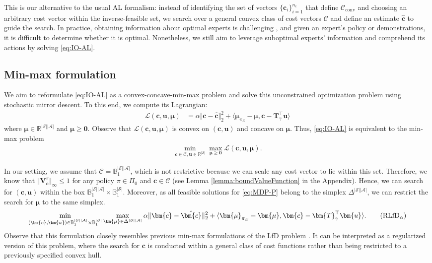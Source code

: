 \documentclass[10pt]{article} %
\def\C{\ensuremath{\mathcal{C}}}
\def\Ac{\ensuremath{\mathcal{A}}}
\def\mTg{{\bm{T}}_\gamma}
\def\vzero{{\bm{0}}}
\def\vc{{\bm{c}}}
\def\vu{{\bm{u}}}
\def\vV{{\bm{V}}}
\def\vmu{{\bm{\mu}}}
\def\sB{{\mathbb{B}}}
\newcommand{\R}{\mathbb{R}}
\newcommand{\St}{\mathcal{S}}
\begin{document}
This is our alternative to the usual AL formalism: instead of identifying the set of vectors $\{\vc_i\}_{i=1}^{n_c}$ that define $\C_{\text{conv}}$ and choosing an arbitrary cost vector within the inverse-feasible set, we search over a general convex class of cost vectors $\C$ and define an estimate $\hat{\vc}$ to guide the search. In practice, obtaining information about optimal experts is challenging \citep{Brown2019, Chen2021, Wang2021}, and given an expert's policy or demonstrations, it is difficult to determine whether it is optimal. Nonetheless, we still aim to leverage suboptimal experts' information and comprehend its actions by solving \ref{eq:IO-AL}.

\subsection{Min-max formulation}
We aim to reformulate \eqref{eq:IO-AL} as a convex-concave-min-max problem and solve this unconstrained optimization problem using stochastic mirror descent. To this end, we compute its Lagrangian:
\begin{align*}
    \mathcal{L}(\vc, \vu, \vmu)  &= \alpha\Vert \vc - \hat{\vc} \Vert^2_2 + \langle \vmu_{\pi_E} -\vmu, \vc - \mTg^\top \vu \rangle
\end{align*}
where $\vmu \in \R^{|\St||\Ac|}$ and $\vmu \geq \vzero$. Observe that $\mathcal{L}(\vc,\vu,\vmu)$ is convex on $(\vc,\vu)$ and concave on $\vmu$. Thus, \eqref{eq:IO-AL} is equivalent to the min-max problem
\begin{align*}
    \min\limits_{\vc\in\C, \vu\in\R^{|\St|}}\max_{\vmu \geq \vzero} \mathcal{L}(\vc, \vu, \vmu).
\end{align*}
\par 
In our setting, we assume that $\C= \sB^{|\St||\Ac|}_1$, which is not restrictive because we can scale any cost vector to lie within this set. Therefore, we know that $\Vert \vV^\pi_{\vc}\Vert_\infty \leq 1$  for any policy $\pi \in \Pi_0$ and $\vc\in\C$ (see Lemma \ref{lemma:boundValueFunction} in the Appendix). 
Hence, we can search for $(\vc,\vu)$ within the box $\sB^{|\St||\Ac|}_1 \times \sB^{|\St|}_1$. Moreover, as all feasible solutions for \eqref{eq:MDP-P} belong to the simplex $\Delta^{|\St||\Ac|}$, we can restrict the search for $\vmu$ to the same simplex.
\begin{align}
    \min\limits_{(\vc,\vu) \in \sB^{|\St||\Ac|}_{1}\times \sB^{|\St|}_{1}}\max_{\vmu \in \Delta^{|\St||\Ac|}} \alpha\Vert \vc - \hat{\vc} \Vert_2^2 + \langle \vmu_{\pi_E} -\vmu, \vc - \mTg^\top \vu \rangle.  \tag{$\text{RLfD}_\alpha$}\label{eq:newproblem}
\end{align}
Observe that this formulation closely resembles previous min-max formulations of the LfD problem \citep{Kamoutsi2021}. It can be interpreted as a regularized version of this problem, where the search for $\vc$ is conducted within a general class of cost functions rather than being restricted to a previously specified convex hull.
\end{document}

